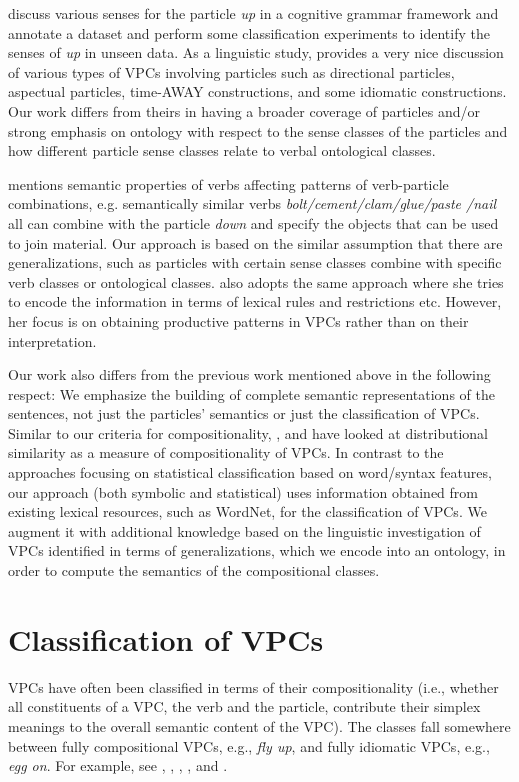\documentclass[output=paper
,modfonts
,nonflat]{langsci/langscibook}
\begin{document}
\citet{Coo06} discuss various senses for the particle \textit{up} in a cognitive grammar framework and annotate a dataset and perform some classification experiments to identify the senses of \textit{up} in unseen data. As a linguistic study, \citet{Jac02} provides a very nice discussion of various types of VPCs involving particles such as directional particles, aspectual particles, time-AWAY constructions, and some idiomatic constructions. Our work differs from theirs in having a broader coverage of particles and/or strong emphasis on ontology with respect to the sense classes of the particles and how different particle sense classes relate to verbal ontological classes.

\citet{Fra76} mentions semantic properties of verbs affecting patterns of verb-particle combinations, e.g. semantically similar verbs \textit{bolt/cement/clam/glue/paste /nail} all can combine with the particle \textit{down} and specify the objects that can be used to join material. Our approach is based on the similar assumption that there are generalizations, such as particles with certain sense classes combine with specific verb classes or ontological classes. \citet{Vil03} also adopts the same approach where she tries to encode the information in terms of lexical rules and restrictions etc. However, her focus is on obtaining productive patterns in VPCs rather than on their interpretation.

Our work also differs from the previous work mentioned above in the following respect: We emphasize the building of complete semantic representations of the sentences, not just the particles' semantics or just the classification of VPCs. Similar to our criteria for compositionality, \citet{McC03}, \citet{Bal03} and \citet{Ban03} have looked at distributional similarity as a measure of compositionality of VPCs. In contrast to the approaches focusing on statistical classification based on word/syntax features, our approach (both symbolic and statistical) uses information obtained from existing lexical resources, such as WordNet, for the classification of VPCs. We augment it with additional knowledge based on the linguistic investigation of VPCs identified in terms of generalizations, which we encode into an ontology, in order to compute the semantics of the compositional classes.


\section{Classification of VPCs } \label{sec:classification}
VPCs have often been classified in terms of their compositionality (i.e., whether all constituents of a VPC, the verb and the particle, contribute their simplex meanings to the overall semantic content of the VPC). The classes fall somewhere between fully compositional VPCs, e.g., \textit{fly up}, and fully idiomatic VPCs, e.g., \textit{egg on}. For example, see \citet{Fra76}, \citet{Che86}, \citet{Odo98}, \citet{Deh02}, and \citet{Jac02}.
\end{document}
